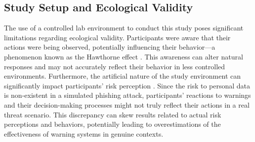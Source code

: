 \documentclass[
  a4paper,  %
  twoside,  %
  bibliography=totoc,
  headsepline,
  cleardoublepage=empty,
  parskip=half,
  draft=false
]{scrbook}
\begin{document}

\subsection{Study Setup and Ecological Validity}
The use of a controlled lab environment to conduct this study poses significant limitations regarding ecological validity. Participants were aware that their actions were being observed, potentially influencing their behavior—a phenomenon known as the Hawthorne effect \cite{jim}. This awareness can alter natural responses and may not accurately reflect their behavior in less controlled environments. \newline
Furthermore, the artificial nature of the study environment can significantly impact participants' risk perception \cite{garfinkel}. Since the risk to personal data is non-existent in a simulated phishing attack, participants' reactions to warnings and their decision-making processes might not truly reflect their actions in a real threat scenario. This discrepancy can skew results related to actual risk perceptions and behaviors, potentially leading to overestimations of the effectiveness of warning systems in genuine contexts.

\end{document}

